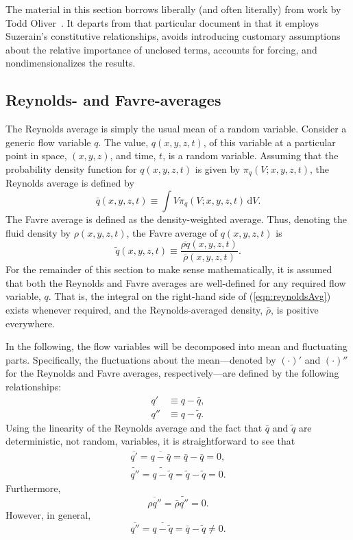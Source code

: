 \documentclass[letterpaper,11pt,nointlimits,reqno,draft]{amsart}
\begin{document}
The material in this section borrows liberally (and often literally) from work
by Todd Oliver~\cite{OliverFANSModels2011}.  It departs from that particular
document in that it employs Suzerain's constitutive relationships, avoids
introducing customary assumptions about the relative importance of unclosed
terms, accounts for forcing, and nondimensionalizes the results.


\subsection{Reynolds- and Favre-averages}
\label{sec:averaging}

The Reynolds average is simply the usual mean of a random variable.  Consider a
generic flow variable $q$.  The value, $q(x, y, z, t)$, of this variable at a
particular point in space, $(x, y, z)$, and time, $t$, is a random variable.
Assuming that the probability density function for $q(x, y, z, t)$ is given by
$\pi_q(V; x, y, z, t)$, the Reynolds average is defined by
%
\begin{equation}
\label{eqn:reynoldsAvg}
\bar{q}(x, y, z, t) \equiv \int V \pi_q(V; x, y, z, t) \,\mathrm{d} V.
\end{equation}
%
The Favre average is defined as the density-weighted average.  Thus,
denoting the fluid density by $\rho(x,y,z, t)$, the Favre average of
$q(x,y,z, t)$ is
%
\begin{equation*}
\tilde{q}(x,y,z, t) \equiv \frac{ \overline{\rho q}(x,y,z, t) }{ \bar{\rho}(x,y,z, t) }.
\end{equation*}
%
For the remainder of this section to make sense mathematically, it is
assumed that both the Reynolds and Favre averages are well-defined for
any required flow variable, $q$.  That is, the integral on the
right-hand side of (\ref{eqn:reynoldsAvg}) exists whenever required,
and the Reynolds-averaged density, $\bar{\rho}$, is positive
everywhere.

In the following, the flow variables will be decomposed into mean and
fluctuating parts.  Specifically, the fluctuations about the
mean---denoted by $(\cdot)'$ and $(\cdot)''$ for the Reynolds and
Favre averages, respectively---are defined by the following
relationships:
%
\begin{align*}
q' &\equiv q - \bar{q}, \\
q'' &\equiv q - \tilde{q}.
\end{align*}
%
Using the linearity of the Reynolds average and the fact that
$\bar{q}$ and $\tilde{q}$ are deterministic, not random, variables, it
is straightforward to see that
%
\begin{gather*}
\overline{q'} = \overline{q - \bar{q}} = \bar{q} - \bar{q} =  0, \\
\widetilde{q''} = \widetilde{q - \tilde{q}} = \tilde{q} - \tilde{q} = 0.
\end{gather*}
%
Furthermore,
%
\begin{equation*}
\overline{\rho q''} = \bar{\rho} \widetilde{q''} = 0.
\end{equation*}
%
However, in general,
%
\begin{equation*}
\overline{q''} = \overline{q - \tilde{q}} = \bar{q} - \tilde{q} \neq 0.
\end{equation*}
%
\end{document}
